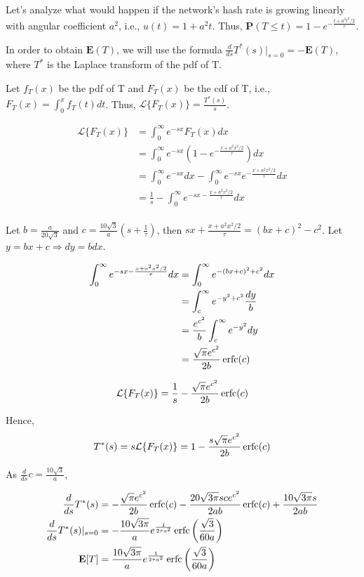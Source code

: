 Let's analyze what would happen if the network's hash rate is growing linearly with angular coefficient $a^2$, i.e., $u(t) = 1 + a^2t$. Thus, $\mathbf{P}(T \leq t) = 1 - e^{-\frac{t + a^2t^2/2}{\tau}}$.

In order to obtain $\mathbf{E}(T)$, we will use the formula $\frac{d}{ds}T^*(s)|_{s=0} = -\mathbf{E}(T)$, where $T^*$ is the Laplace transform of the pdf of T.

Let $f_T(x)$ be the pdf of T and $F_T(x)$ be the cdf of T, i.e., $F_T(x) = \int_0^x f_T(t) dt$. Thus, $\mathcal{L}\{F_T(x)\} = \frac{T^*(s)}{s}$.

\begin{align*}
	\mathcal{L}\{F_T(x)\} &= \int_0^\infty e^{-sx} F_T(x) dx \\
		&= \int_0^\infty e^{-sx} \left( 1 - e^{-\frac{x + a^2x^2/2}{\tau}} \right) dx \\
		&= \int_0^\infty e^{-sx} dx - \int_0^\infty e^{-sx} e^{-\frac{x + a^2x^2/2}{\tau}} dx \\
		&= \frac{1}{s} - \int_0^\infty e^{-sx -\frac{x + a^2x^2/2}{\tau}} dx \\
\end{align*}

Let $b=\frac{a}{20\sqrt{3}}$ and $c = \frac{10\sqrt{3}}{a} \left( s + \frac{1}{\tau} \right)$, then $sx + \frac{x+a^2x^2/2}{\tau} = (bx + c)^2 - c^2$.
Let $y = bx+c \Rightarrow dy = bdx$.

\begin{align*}
	\int_0^\infty e^{-sx -\frac{x + a^2x^2/2}{\tau}} dx &= \int_0^\infty e^{-(bx+c)^2 + c^2} dx \\
		&= \int_c^\infty e^{-y^2 + c^2} \frac{dy}{b} \\
		&= \frac{e^{c^2}}{b} \int_c^\infty e^{-y^2} dy \\
		&= \frac{\sqrt{\pi}e^{c^2}}{2b} \operatorname{erfc}(c)
\end{align*}

$$ \mathcal{L}\{F_T(x)\} = \frac{1}{s} - \frac{\sqrt{\pi}e^{c^2}}{2b} \operatorname{erfc}(c) $$

Hence,
$$ T^*(s) = s \mathcal{L}\{F_T(x)\} = 1 - \frac{s\sqrt{\pi}e^{c^2}}{2b} \operatorname{erfc}(c) $$

As $\frac{d}{ds}c = \frac{10\sqrt{3}}{a}$,

\begin{align*}
\frac{d}{ds} T^*(s) &= - \frac{\sqrt{\pi}e^{c^2}}{2b} \operatorname{erfc}(c) - \frac{20\sqrt{3\pi} sc e^{c^2}}{2ab} \operatorname{erfc}(c) + \frac{10\sqrt{3\pi}s}{2ab} \\
\frac{d}{ds} T^*(s)|_{s=0} &= - \frac{10\sqrt{3\pi}}{a} e^{\frac{1}{2 \tau a^2}} \operatorname{erfc}\left(\frac{\sqrt{3}}{60a}\right) \\
\mathbf{E}[T] &= \frac{10\sqrt{3\pi}}{a} e^{\frac{1}{2 \tau a^2}} \operatorname{erfc}\left(\frac{\sqrt{3}}{60a}\right)
\end{align*}

